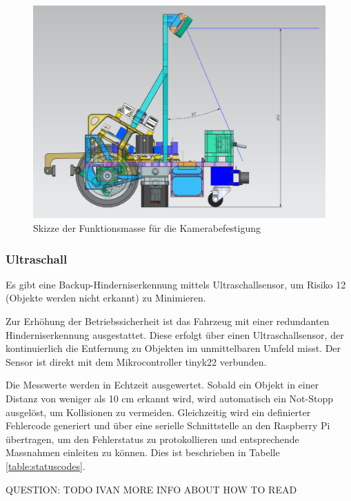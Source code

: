  \begin{figure}[H]
\centering
\includegraphics[width= \textwidth ]{assets/MT/Sichtfeld_Roboter.png}
\caption{Skizze der Funktionsmasse für die Kamerabefestigung}
\label{fig:Skizze der Funktionsmasse für die Kamerabefestigung}
\end{figure}


\subsubsection{Ultraschall}
\label{ultraschall}

Es gibt eine Backup-Hinderniserkennung mittels Ultraschallsensor, um Risiko 12 (Objekte werden nicht erkannt) zu Minimieren.

Zur Erhöhung der Betriebssicherheit ist das Fahrzeug mit einer redundanten Hinderniserkennung ausgestattet. Diese erfolgt über einen Ultraschallsensor, der kontinuierlich die Entfernung zu Objekten im unmittelbaren Umfeld misst. Der Sensor ist direkt mit dem Mikrocontroller \gls{tinyk22} verbunden.

Die Messwerte werden in Echtzeit ausgewertet. Sobald ein Objekt in einer Distanz von weniger als 10 cm erkannt wird, wird automatisch ein Not-Stopp ausgelöst, um Kollisionen zu vermeiden. Gleichzeitig wird ein definierter Fehlercode generiert und über eine serielle Schnittstelle an den Raspberry Pi übertragen, um den Fehlerstatus zu protokollieren und entsprechende Massnahmen einleiten zu können. Dies ist beschrieben in Tabelle \ref{table:statuscodes}.


QUESTION: TODO IVAN MORE INFO ABOUT HOW TO READ 

